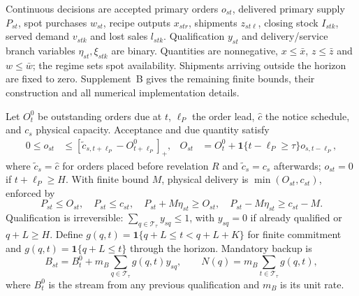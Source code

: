 \documentclass[preprint,11pt,authoryear]{elsarticle}
\begin{document}
Continuous decisions are accepted primary orders $o_{st}$, delivered primary supply $P_{st}$, spot purchases $w_{st}$, recipe outputs $x_{str}$, shipments $z_{st\ell}$, closing stock $I_{stk}$, served demand $v_{stk}$ and lost sales $l_{stk}$. Qualification $y_{st}$ and delivery/service branch variables $\eta_{st},\xi_{stk}$ are binary. Quantities are nonnegative, $x\le\bar x$, $z\le\bar z$ and $w\le\bar w$; the regime sets spot availability. Shipments arriving outside the horizon are fixed to zero. Supplement~B gives the remaining finite bounds, their construction and all numerical implementation details.

Let $O^0_t$ be outstanding orders due at $t$, $\ell_P$ the order lead, $\widehat c$ the notice schedule, and $c_s$ physical capacity. Acceptance and due quantity satisfy
\begin{align}
0\le o_{st}&\le[\widetilde c_{s,t+\ell_P}-O^0_{t+\ell_P}]_+,
& O_{st}&=O^0_t+\mathbf1\{t-\ell_P\ge\tau\}o_{s,t-\ell_P},\label{eq:article_orders}
\end{align}
where $\widetilde c_s=\widehat c$ for orders placed before revelation $R$ and $\widetilde c_s=c_s$ afterwards; $o_{st}=0$ if $t+\ell_P\ge H$. With finite bound $M$, physical delivery is $\min(O_{st},c_{st})$, enforced by
\begin{equation}
P_{st}\le O_{st},\quad P_{st}\le c_{st},\quad
P_{st}+M\eta_{st}\ge O_{st},\quad P_{st}-M\eta_{st}\ge c_{st}-M.\label{eq:article_delivery}
\end{equation}
Qualification is irreversible: $\sum_{q\in\mathcal T_\tau}y_{sq}\le1$, with $y_{sq}=0$ if already qualified or $q+L\ge H$. Define $g(q,t)=\mathbf1\{q+L\le t<q+L+K\}$ for finite commitment and $g(q,t)=\mathbf1\{q+L\le t\}$ through the horizon. Mandatory backup is
\begin{equation}
B_{st}=B^0_t+m_B\sum_{q\in\mathcal T_\tau}g(q,t)y_{sq},
\qquad N(q)=m_B\sum_{t\in\mathcal T_\tau}g(q,t),\label{eq:article_backup}
\end{equation}
where $B^0_t$ is the stream from any previous qualification and $m_B$ is its unit rate.
\end{document}
